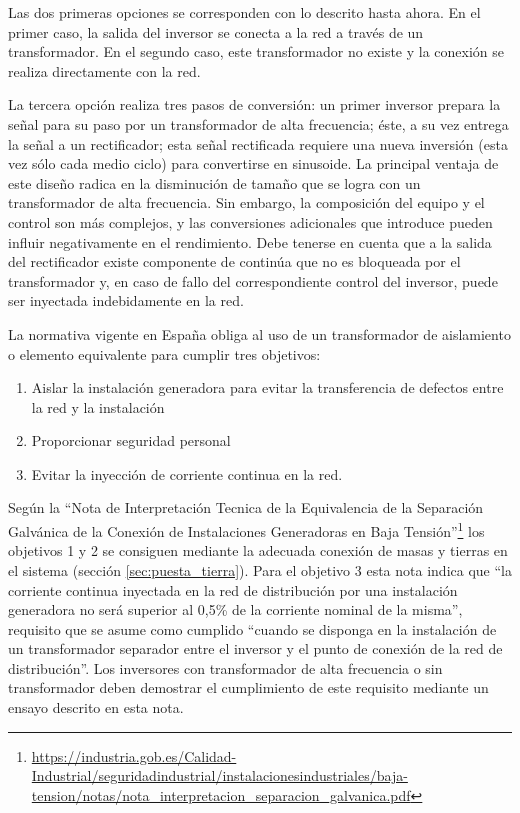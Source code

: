 Las dos primeras opciones se corresponden con lo descrito hasta ahora.
En el primer caso, la salida del inversor se conecta a la red a través
de un transformador. En el segundo caso, este transformador no existe
y la conexión se realiza directamente con la red. 

La tercera opción realiza tres pasos de conversión: un primer inversor
prepara la señal para su paso por un transformador de alta frecuencia;
éste, a su vez entrega la señal a un rectificador; esta señal rectificada
requiere una nueva inversión (esta vez sólo cada medio ciclo) para
convertirse en sinusoide. La principal ventaja de este diseño radica
en la disminución de tamaño que se logra con un transformador de alta
frecuencia. Sin embargo, la composición del equipo y el control son
más complejos, y las conversiones adicionales que introduce pueden
influir negativamente en el rendimiento. Debe tenerse en cuenta que
a la salida del rectificador existe componente de continúa que no
es bloqueada por el transformador y, en caso de fallo del correspondiente
control del inversor, puede ser inyectada indebidamente en la red.

La normativa vigente en España obliga al uso de un transformador de
aislamiento o elemento equivalente para cumplir tres objetivos:
\begin{enumerate}
\item Aislar la instalación generadora para evitar la transferencia de
  defectos entre la red y la instalación
\item Proporcionar seguridad personal
\item Evitar la inyección de corriente continua en la red.
\end{enumerate}

Según la ``Nota de Interpretación Tecnica de la Equivalencia de la
Separación Galvánica de la Conexión de Instalaciones Generadoras en
Baja
Tensión''\footnote{\url{https://industria.gob.es/Calidad-Industrial/seguridadindustrial/instalacionesindustriales/baja-tension/notas/nota_interpretacion_separacion_galvanica.pdf}}
los objetivos 1 y 2 se consiguen mediante la adecuada conexión de masas
y tierras en el sistema (sección \ref{sec:puesta_tierra}). Para el
objetivo 3 esta nota indica que ``la corriente continua inyectada en
la red de distribución por una instalación generadora no será superior
al 0,5\% de la corriente nominal de la misma'', requisito que se asume
como cumplido ``cuando se disponga en la instalación de un
transformador separador entre el inversor y el punto de conexión de la
red de distribución''. Los inversores con transformador de alta
frecuencia o sin transformador deben demostrar el cumplimiento de este
requisito mediante un ensayo descrito en esta nota.

